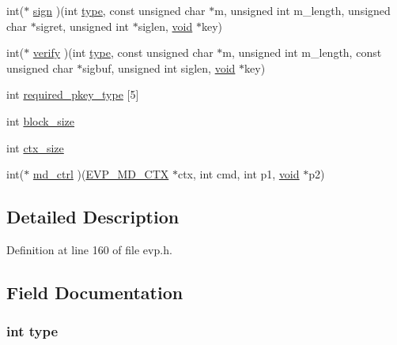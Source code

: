 \begin{DoxyCompactItemize}
\item 
int($\ast$ \hyperlink{structenv__md__st_a1ca226f483351fd092e4d5aa8bbb463d}{sign} )(int \hyperlink{structenv__md__st_ac765329451135abec74c45e1897abf26}{type}, const unsigned char $\ast$m, unsigned int m\+\_\+length, unsigned char $\ast$sigret, unsigned int $\ast$siglen, \hyperlink{hw__4758__cca_8h_afad4d591c7931ff6dc5bf69c76c96aa0}{void} $\ast$key)
\item 
int($\ast$ \hyperlink{structenv__md__st_a2ad5f09146f8777f4b33734059299241}{verify} )(int \hyperlink{structenv__md__st_ac765329451135abec74c45e1897abf26}{type}, const unsigned char $\ast$m, unsigned int m\+\_\+length, const unsigned char $\ast$sigbuf, unsigned int siglen, \hyperlink{hw__4758__cca_8h_afad4d591c7931ff6dc5bf69c76c96aa0}{void} $\ast$key)
\item 
int \hyperlink{structenv__md__st_a21ae753f0351415b07b769dacb76860e}{required\+\_\+pkey\+\_\+type} \mbox{[}5\mbox{]}
\item 
int \hyperlink{structenv__md__st_a70b27761c7d0bd5cd90f4fe47e569b94}{block\+\_\+size}
\item 
int \hyperlink{structenv__md__st_a283e909780db477722c366b5e1425f7d}{ctx\+\_\+size}
\item 
int($\ast$ \hyperlink{structenv__md__st_ac37e525c46d80be4d6d81186a42222e3}{md\+\_\+ctrl} )(\hyperlink{crypto_2ossl__typ_8h_a69cda4d21bd068f01c469222c1dd92fe}{E\+V\+P\+\_\+\+M\+D\+\_\+\+C\+TX} $\ast$ctx, int cmd, int p1, \hyperlink{hw__4758__cca_8h_afad4d591c7931ff6dc5bf69c76c96aa0}{void} $\ast$p2)
\end{DoxyCompactItemize}


\subsection{Detailed Description}


Definition at line 160 of file evp.\+h.



\subsection{Field Documentation}
\subsubsection[{\texorpdfstring{type}{type}}]{\setlength{\rightskip}{0pt plus 5cm}int type}\hypertarget{structenv__md__st_ac765329451135abec74c45e1897abf26}{}\label{structenv__md__st_ac765329451135abec74c45e1897abf26}


